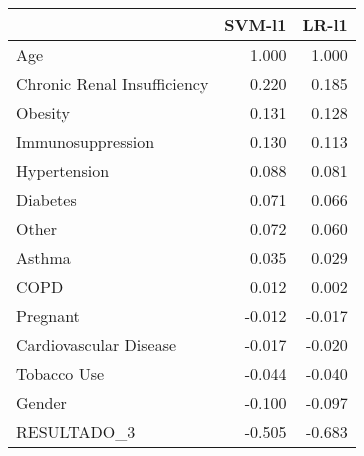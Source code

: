 \begin{tabular}{lrr}
\toprule
{} &  SVM-l1 &  LR-l1 \\
\midrule
Age                         &   1.000 &  1.000 \\
Chronic Renal Insufficiency &   0.220 &  0.185 \\
Obesity                     &   0.131 &  0.128 \\
Immunosuppression           &   0.130 &  0.113 \\
Hypertension                &   0.088 &  0.081 \\
Diabetes                    &   0.071 &  0.066 \\
Other                       &   0.072 &  0.060 \\
Asthma                      &   0.035 &  0.029 \\
COPD                        &   0.012 &  0.002 \\
Pregnant                    &  -0.012 & -0.017 \\
Cardiovascular Disease      &  -0.017 & -0.020 \\
Tobacco Use                 &  -0.044 & -0.040 \\
Gender                      &  -0.100 & -0.097 \\
RESULTADO\_3                 &  -0.505 & -0.683 \\
\bottomrule
\end{tabular}
